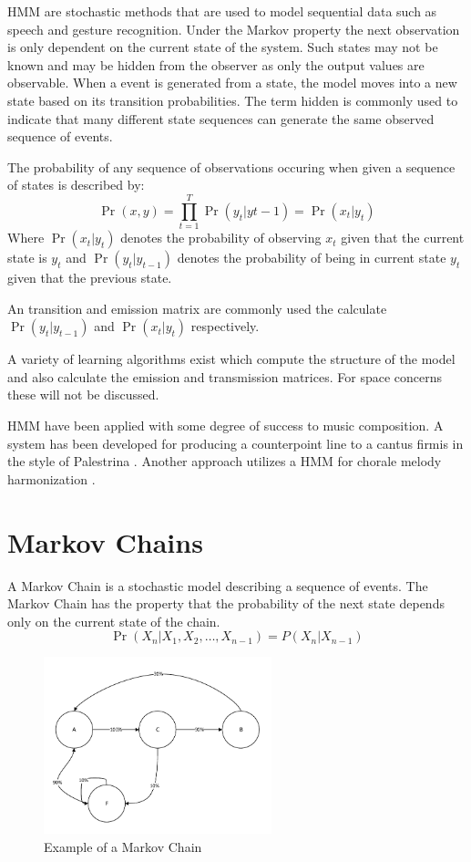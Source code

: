 \ac{HMM} are stochastic methods that are used to model sequential data such as speech and gesture recognition.
Under the Markov property the next observation is only dependent on the current state of the system. Such states may not be known and may be hidden from the observer as only the output values are observable. When a event is generated from a state, the model moves into a new state based on its transition probabilities. The term hidden is commonly used to indicate that many different state sequences can generate the same observed sequence of events.

The probability of any sequence of observations occuring when given a sequence of states is described by:
\[\Pr(x,y) = \prod^T_{t=1} \Pr(y_t | y{t-1}) = \Pr(x_t | y_t) \]
Where $\Pr(x_t|y_t)$ denotes the probability of observing $x_t$ given that the current state is $y_t$ and $\Pr(y_t|y_{t-1})$ denotes the probability of being in current state $y_t$ given that the previous state.

An transition and emission matrix are commonly used the calculate $\Pr(y_t|y_{t-1})$ and $\Pr(x_t|y_t)$ respectively.

A variety of learning algorithms exist which compute the structure of the model and also calculate the emission and transmission matrices. For space concerns these will not be discussed.

\acs{HMM} have been applied with some degree of success to music composition. A system has been developed for producing a counterpoint line to a cantus firmis in the style of Palestrina \cite{Farbood2001}. Another approach utilizes a \ac{HMM} for chorale melody harmonization \cite{Allan2004}.



\section{Markov Chains} \label{sec:markov_backround}
A Markov Chain is a stochastic model describing a sequence of events. The Markov Chain has the property that the probability of the next state depends only on the current state of the chain.
\[ \Pr(X_n | X_1, X_2, \ldots, X_{n-1}) = P(X_n | X_{n-1})  \]

\begin{figure}
\center
\includegraphics[width=250px]{../images/markov_chain_example.pdf}
\caption{Example of a Markov Chain}
\label{ims:markov_chain_example}
\end{figure}

